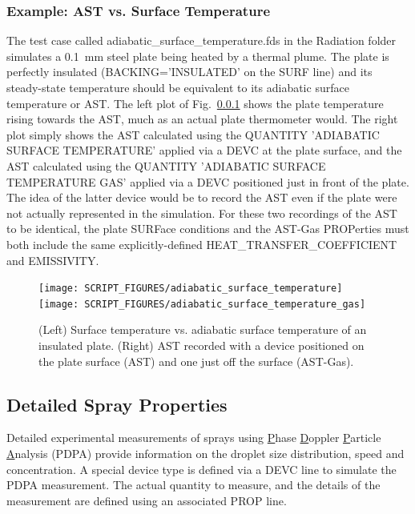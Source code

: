 \documentclass[11pt]{book}
\begin{document}
\subsubsection{Example: AST vs. Surface Temperature}
\label{adiabatic_surface_temperature}

The test case called {\ct adiabatic\_surface\_temperature.fds} in the {\ct Radiation} folder simulates a 0.1~mm steel plate being heated by a thermal plume. The plate is perfectly insulated ({\ct BACKING='INSULATED'} on the {\ct SURF} line) and its steady-state temperature should be equivalent to its adiabatic surface temperature or AST. The left plot of Fig.~\ref{adiabatic_surface_temperature} shows the plate temperature rising towards the AST, much as an actual plate thermometer would. The right plot simply shows the AST calculated using the {\ct QUANTITY} {\ct 'ADIABATIC SURFACE TEMPERATURE'} applied via a {\ct DEVC} at the plate surface, and the AST calculated using the {\ct QUANTITY} {\ct 'ADIABATIC SURFACE TEMPERATURE GAS'} applied via a {\ct DEVC} positioned just in front of the plate. The idea of the latter device would be to record the AST even if the plate were not actually represented in the simulation. For these two recordings of the AST to be identical, the plate {\ct SURF}ace conditions and the AST-Gas {\ct PROP}erties must both include the same explicitly-defined {\ct HEAT\_TRANSFER\_COEFFICIENT} and {\ct EMISSIVITY}.

\begin{figure}[ht]
\texttt{[image: SCRIPT\_FIGURES/adiabatic\_surface\_temperature]}
\texttt{[image: SCRIPT\_FIGURES/adiabatic\_surface\_temperature\_gas]}
\caption[Results of the {\ct adiabatic\_surface\_temperature} test case]{(Left) Surface temperature vs. adiabatic surface temperature of an insulated plate. (Right) AST recorded with a device positioned on the plate surface (AST) and one just off the surface (AST-Gas).}
\label{adiabatic_surface_temperature_fig}
\end{figure}



\subsection{Detailed Spray Properties}
\label{PDPA}

Detailed experimental measurements of sprays using \underline{P}hase \underline{D}oppler \underline{P}article \underline{A}nalysis (PDPA) provide information on the droplet size distribution, speed and concentration. A special device type is defined via a {\ct DEVC} line to simulate the PDPA measurement. The actual quantity to measure, and the details of the measurement are defined using an associated {\ct PROP} line.
\end{document}
